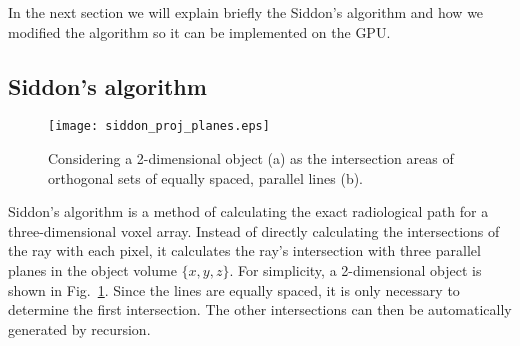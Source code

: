 In the next section we will explain briefly the Siddon's algorithm and how we modified the algorithm so it can be implemented on the GPU. 

\subsection{Siddon's algorithm}
%
\begin{figure}
\centering
\texttt{[image: siddon\_proj\_planes.eps]}
\caption{Considering a 2-dimensional object (a) as the intersection areas of orthogonal sets of equally spaced, parallel lines (b).}
\label{fig:forward_backward_model}
\end{figure}
%
Siddon's algorithm is a method of calculating the exact radiological path for a three-dimensional voxel array.  Instead of directly calculating the intersections of the ray with each pixel, it calculates the ray's intersection with three parallel planes in the object volume $\{ x, y, z \}$.  For simplicity, a 2-dimensional object is shown in Fig.~\ref{fig:forward_backward_model}.  Since the lines are equally spaced, it is only necessary to determine the first intersection.  The other intersections can then be automatically generated by recursion.  

